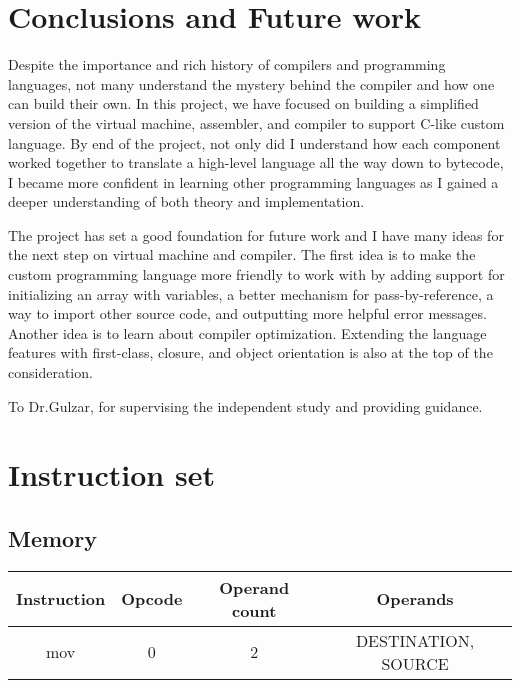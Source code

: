\documentclass[manuscript,screen,nonacm]{acmart}
\begin{document}
\section{Conclusions and Future work}
Despite the importance and rich history of compilers and programming languages, not many understand the mystery behind the compiler and how one can build their own. In this project, we have focused on building a simplified version of the virtual machine, assembler, and compiler to support C-like custom language. By end of the project, not only did I understand how each component worked together to translate a high-level language all the way down to bytecode, I became more confident in learning other programming languages as I gained a deeper understanding of both theory and implementation. 

The project has set a good foundation for future work and I have many ideas for the next step on virtual machine and compiler. The first idea is to make the custom programming language more friendly to work with by adding support for initializing an array with variables, a better mechanism for pass-by-reference, a way to import other source code, and outputting more helpful error messages. Another idea is to learn about compiler optimization. Extending the language features with first-class, closure, and object orientation is also at the top of the consideration.


\begin{acks}
To Dr.Gulzar, for supervising the independent study and providing guidance.
\end{acks}




\appendix

\section{Instruction set}
\subsection{Memory}
\begin{center}
\begin{tabular}{|c|c|c|c|}
    \hline
    Instruction & Opcode & Operand count & Operands \\
    \hline
    mov & 0 & 2 & DESTINATION, SOURCE \\
    \hline
\end{tabular}
\end{center}
\end{document}
